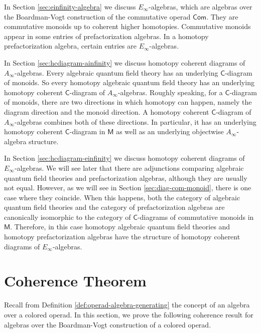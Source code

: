 \documentclass{amsbook}
\numberwithin{section}{chapter}
\numberwithin{subsection}{section}
\numberwithin{equation}{section}
\theoremstyle{plain}
\theoremstyle{definition}
\newcommand{\C}{\mathsf{C}}
\newcommand{\M}{\mathsf{M}}
\newcommand{\Com}{\mathsf{Com}}
\begin{document}
In Section \ref{sec:einfinity-algebra} we discuss $E_{\infty}$-algebras, which are algebras over the Boardman-Vogt construction of the commutative operad $\Com$.  They are commutative monoids up to coherent higher homotopies.  Commutative monoids appear in some entries of prefactorization algebras.  In a homotopy prefactorization algebra, certain entries are $E_\infty$-algebras.  

In Section \ref{sec:hcdiagram-ainfinity} we discuss homotopy coherent diagrams of $A_\infty$-algebras.  Every algebraic quantum field theory has an underlying $\C$-diagram of monoids.  So every homotopy algebraic quantum field theory has an underlying homotopy coherent $\C$-diagram  of $A_\infty$-algebras.  Roughly speaking, for a $\C$-diagram of monoids, there are two directions in which homotopy can happen, namely the diagram direction and the monoid direction.  A homotopy coherent $\C$-diagram of $A_\infty$-algebras combines both of these directions.  In particular, it has an underlying homotopy coherent $\C$-diagram in $\M$ as well as an underlying objectwise $A_\infty$-algebra structure.

In Section \ref{sec:hcdiagram-einfinity} we discuss homotopy coherent diagrams of $E_\infty$-algebras. We will see later that there are adjunctions comparing algebraic quantum field theories and prefactorization algebras, although they are usually not equal.  However, as we will see in Section  \ref{sec:diag-com-monoid}, there is one case where they coincide.  When this happens, both the category of algebraic quantum field theories and the category of prefactorization algebras are canonically isomorphic to the category of $\C$-diagrams of commutative monoids in $\M$.  Therefore, in this case homotopy algebraic quantum field theories and homotopy prefactorization algebras have the structure of homotopy coherent diagrams of $E_\infty$-algebras.


\section{Coherence Theorem}\label{sec:algebra-bv}

Recall from Definition \ref{def:operad-algebra-generating} the concept of an algebra over a colored operad.  In this section, we prove the following coherence result for algebras over the Boardman-Vogt construction of a colored operad.
\end{document}

